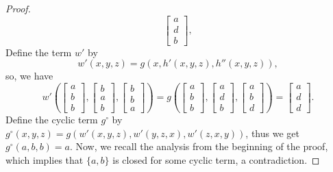 \documentclass[10pt,a4paper]{amsart}
\begin{document}
\begin{proof}
\begin{equation*}
\begin{bmatrix}
a \\
d\\
b
\end{bmatrix},
\end{equation*}
Define the term $w'$ by $$w'(x,y,z)=g(x,h'(x,y,z),h''(x,y,z)),$$ so, we have 
\begin{equation*}
w'\left(
\begin{bmatrix}
a \\
b \\
b
\end{bmatrix}\!,\!
\begin{bmatrix}
b \\
a \\
b
\end{bmatrix}\!,\!
\begin{bmatrix}
b \\
b \\
a
\end{bmatrix}
\right)=g\left(
\begin{bmatrix}
a \\
b \\
b
\end{bmatrix}\!,\!
\begin{bmatrix}
a \\
d \\
b
\end{bmatrix}\!,\!
\begin{bmatrix}
a \\
b \\
d
\end{bmatrix}
\right)=
\begin{bmatrix}
a \\
d \\
d
\end{bmatrix}.
\end{equation*}
Define the cyclic term $g^{\circ}$ by $g^{\circ}(x,y,z)=g(w'(x,y,z),w'(y,z,x),w'(z,x,y))$, thus we get $g^{\circ}(a,b,b)=a$. Now, we recall the analysis from the beginning of the proof, which implies that $\{a,b\}$ is closed for some cyclic term, a contradiction.


\end{proof}
\end{document}

